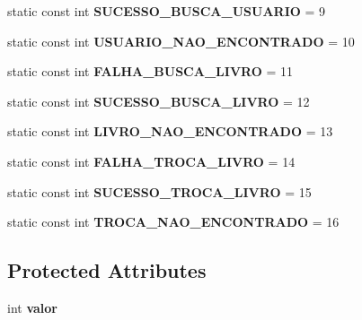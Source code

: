 \begin{DoxyCompactItemize}
\item 
\mbox{\label{classResultado_aa09cc749e044cf8023941a8170109a19}} 
static const int {\bfseries S\+U\+C\+E\+S\+S\+O\+\_\+\+B\+U\+S\+C\+A\+\_\+\+U\+S\+U\+A\+R\+IO} = 9
\item 
\mbox{\label{classResultado_a1fe9b4821b17f229b86b7d9ec0d924f0}} 
static const int {\bfseries U\+S\+U\+A\+R\+I\+O\+\_\+\+N\+A\+O\+\_\+\+E\+N\+C\+O\+N\+T\+R\+A\+DO} = 10
\item 
\mbox{\label{classResultado_a8a027a5d7f34af6e23920ea7f165c7a5}} 
static const int {\bfseries F\+A\+L\+H\+A\+\_\+\+B\+U\+S\+C\+A\+\_\+\+L\+I\+V\+RO} = 11
\item 
\mbox{\label{classResultado_a16a24484c742f4ef6279047e1496f117}} 
static const int {\bfseries S\+U\+C\+E\+S\+S\+O\+\_\+\+B\+U\+S\+C\+A\+\_\+\+L\+I\+V\+RO} = 12
\item 
\mbox{\label{classResultado_a47b88abe70e197311a76093b4083eea8}} 
static const int {\bfseries L\+I\+V\+R\+O\+\_\+\+N\+A\+O\+\_\+\+E\+N\+C\+O\+N\+T\+R\+A\+DO} = 13
\item 
\mbox{\label{classResultado_a492d05d17c31be790c473c847666d7f8}} 
static const int {\bfseries F\+A\+L\+H\+A\+\_\+\+T\+R\+O\+C\+A\+\_\+\+L\+I\+V\+RO} = 14
\item 
\mbox{\label{classResultado_afd82b29826fc7f5c2efe508652c2c890}} 
static const int {\bfseries S\+U\+C\+E\+S\+S\+O\+\_\+\+T\+R\+O\+C\+A\+\_\+\+L\+I\+V\+RO} = 15
\item 
\mbox{\label{classResultado_abd7ba2d8f693cac5edcb3257cb318a56}} 
static const int {\bfseries T\+R\+O\+C\+A\+\_\+\+N\+A\+O\+\_\+\+E\+N\+C\+O\+N\+T\+R\+A\+DO} = 16
\end{DoxyCompactItemize}
\subsection*{Protected Attributes}
\begin{DoxyCompactItemize}
\item 
\mbox{\label{classResultado_a452e65ac80b05f5081642c869d960ac9}} 
int {\bfseries valor}
\end{DoxyCompactItemize}


